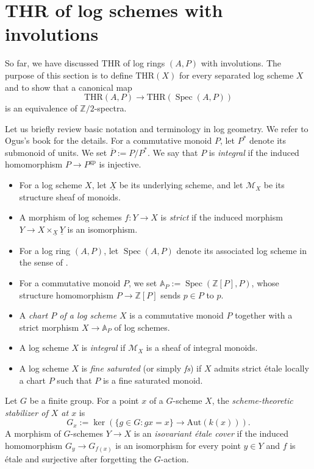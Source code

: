 \documentclass[10pt]{amsart}
\theoremstyle{definition}
\theoremstyle{remark}
\numberwithin{equation}{section}
\newcommand{\A}{\mathbb{A}}
\newcommand{\Z}{\mathbb{Z}}
\newcommand{\cM}{\mathcal{M}}
\DeclareMathOperator{\Spec}{Spec}
\newcommand{\ul}{\underline}
\newcommand{\ol}{\overline}
\newcommand{\THR}{\mathrm{THR}}
\newcommand{\gp}{\mathrm{gp}}
\begin{document}
\section{THR of log schemes with involutions}
\label{thrscheme}

So far,
we have discussed $\THR$ of log rings $(A,P)$ with involutions.
The purpose of this section is to define $\THR(X)$ for every separated log scheme $X$ and to show that a canonical map
\[
\THR(A,P)
\to
\THR(\Spec(A,P))
\]
is an equivalence of $\Z/2$-spectra.




Let us briefly review basic notation and terminology in log geometry.
We refer to Ogus's book \cite{Ogu} for the details.
For a commutative monoid $P$,
let $P^*$ denote its submonoid of units.
We set $\ol{P}:=P/P^*$.
We say that $P$ is \emph{integral} if the induced homomorphism $P\to P^\gp$ is injective.
\begin{itemize}
\item
For a log scheme $X$,
let $\ul{X}$ be its underlying scheme,
and let $\cM_X$ be its structure sheaf of monoids.
\item
A morphism of log schemes $f\colon Y\to X$ is \emph{strict} if the induced morphism $Y\to X\times_{\ul{X}}\ul{Y}$ is an isomorphism.
\item
For a log ring $(A,P)$,
let $\Spec(A,P)$ denote its associated log scheme in the sense of \cite[Definition III.1.2.3]{Ogu}.
\item
For a commutative monoid $P$,
we set $\A_P:=\Spec(\Z[P],P)$,
whose structure homomorphism $P\to \Z[P]$ sends $p\in P$ to $p$.
\item
A \emph{chart $P$ of a log scheme $X$} is a commutative monoid $P$ together with a strict morphism $X\to \A_P$ of log schemes.
\item
A log scheme $X$ is \emph{integral} if $\cM_X$ is a sheaf of integral monoids.
\item
A log scheme $X$ is \emph{fine saturated} (or simply \emph{fs}) if $X$ admits strict \'etale locally a chart $P$ such that $P$ is a fine saturated monoid.
\end{itemize}









Let $G$ be a finite group.
For a point $x$ of a $G$-scheme $X$,
the \emph{scheme-theoretic stabilizer of $X$ at $x$} is
\[
G_x
:=
\ker(
\{
g\in G:gx=x
\}\to \mathrm{Aut}(k(x))).
\]
A morphism of $G$-schemes $Y\to X$ is an \emph{isovariant \'etale cover} if the induced homomorphism $G_y\to G_{f(x)}$ is an isomorphism for every point $y\in Y$
and $f$ is \'etale and surjective after forgetting the $G$-action.
\end{document}
